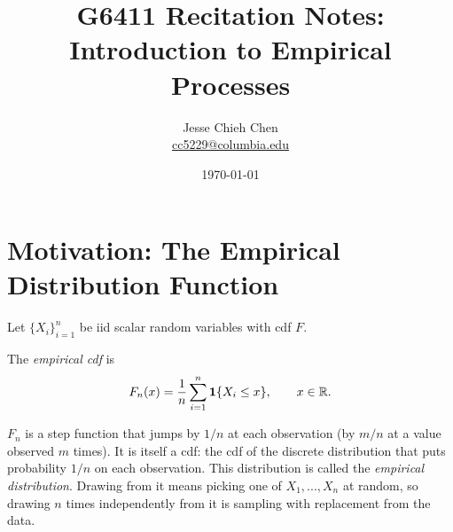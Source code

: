 \documentclass[a4paper,12pt]{article}
\title{G6411 Recitation Notes: Introduction to Empirical Processes}
\author{Jesse Chieh Chen\\\href{mailto:cc5229@columbia.edu}{cc5229@columbia.edu}}
\date{\today}
\begin{document}
\appendix

\section{Motivation: The Empirical Distribution Function}

Let $\{X_i\}_{i=1}^{n}$ be \gls{iid} scalar random variables with \gls{cdf} $F$.

\begin{definition}
	The \emph{empirical \gls{cdf}} is
	\begin{align}
		F_n(x)=\frac1n\sum_{i=1}^n\mathbf{1}\{X_i\le x\},
		\qquad x\in\mathbb{R}.
	\end{align}
\end{definition}

\begin{remark}
	$F_n$ is a step function that jumps by $1/n$ at each observation (by $m/n$ at a value observed $m$ times).
	It is itself a \gls{cdf}: the \gls{cdf} of the discrete distribution that puts probability $1/n$ on each observation.
	This distribution is called the \emph{empirical distribution}.
	Drawing from it means picking one of $X_1,...,X_n$ at random,
	so drawing $n$ times independently from it is sampling with replacement from the data.
\end{remark}
\end{document}
